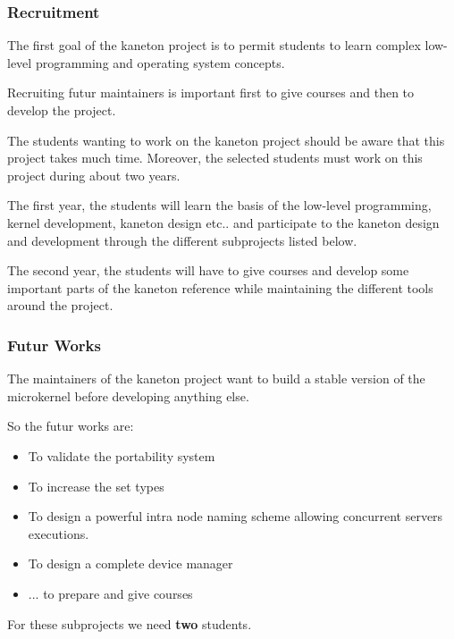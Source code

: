 
\begin{frame}
  \frametitle{Recruitment}

  The first goal of the kaneton project is to permit students to
  learn complex low-level programming and operating system concepts.

  \nl

  Recruiting futur maintainers is important first to give courses
  and then to develop the project.

  \nl

  The students wanting to work on the kaneton project should be aware
  that this project takes much time. Moreover, the selected students
  must work on this project during about two years.

  \nl

  The first year, the students will learn the basis of the low-level
  programming, kernel development, kaneton design etc.. and participate
  to the kaneton design and development through the different subprojects
  listed below.

  \nl

  The second year, the students will have to give courses and develop
  some important parts of the kaneton reference while maintaining the
  different tools around the project.
\end{frame}


\begin{frame}
  \frametitle{Futur Works}

  The maintainers of the kaneton project want to build a stable version
  of the microkernel before developing anything else.

  \nl

  So the futur works are:

  \begin{itemize}[<+->]
    \item
      To validate the portability system
    \item
      To increase the set types
    \item
      To design a powerful intra node naming scheme allowing concurrent
      servers executions.
    \item
      To design a complete device manager
    \item
      ... to prepare and give courses
  \end{itemize}

  \nl

  For these subprojects we need \textbf{two} students.
\end{frame}

